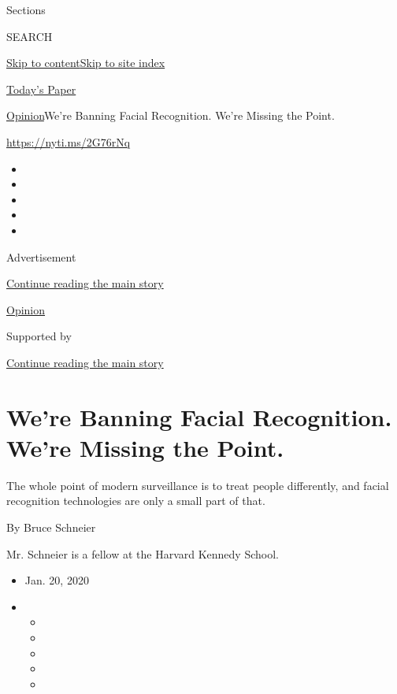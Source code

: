 Sections

SEARCH

\protect\hyperlink{site-content}{Skip to
content}\protect\hyperlink{site-index}{Skip to site index}

\href{https://myaccount.nytimes.com/auth/login?response_type=cookie\&client_id=vi}{}

\href{https://www.nytimes.com/section/todayspaper}{Today's Paper}

\href{/section/opinion}{Opinion}\textbar{}We're Banning Facial
Recognition. We're Missing the Point.

\url{https://nyti.ms/2G76rNq}

\begin{itemize}
\item
\item
\item
\item
\item
\end{itemize}

Advertisement

\protect\hyperlink{after-top}{Continue reading the main story}

\href{/section/opinion}{Opinion}

Supported by

\protect\hyperlink{after-sponsor}{Continue reading the main story}

\hypertarget{were-banning-facial-recognition-were-missing-the-point}{%
\section{We're Banning Facial Recognition. We're Missing the
Point.}\label{were-banning-facial-recognition-were-missing-the-point}}

The whole point of modern surveillance is to treat people differently,
and facial recognition technologies are only a small part of that.

By Bruce Schneier

Mr. Schneier is a fellow at the Harvard Kennedy School.

\begin{itemize}
\item
  Jan. 20, 2020
\item
  \begin{itemize}
  \item
  \item
  \item
  \item
  \item
  \end{itemize}
\end{itemize}

